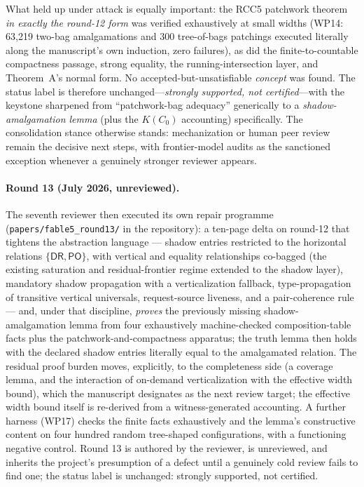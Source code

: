 \documentclass[
]{ceurart}
\theoremstyle{definition}
\newcommand{\DR}{\ensuremath{\mathsf{DR}}}
\newcommand{\PO}{\ensuremath{\mathsf{PO}}}
\begin{document}
What held up under attack is equally important: the RCC5 patchwork theorem
\emph{in exactly the round-12 form} was verified exhaustively at small
widths (WP14: 63{,}219 two-bag amalgamations and 300 tree-of-bags patchings
executed literally along the manuscript's own induction, zero failures), as
did the finite-to-countable compactness passage, strong equality, the
running-intersection layer, and Theorem~A's normal form.  No
accepted-but-unsatisfiable \emph{concept} was found.  The status label is
therefore unchanged---\emph{strongly supported, not certified}---with the
keystone sharpened from ``patchwork-bag adequacy'' generically to a
\emph{shadow-amalgamation lemma} (plus the $K(C_0)$ accounting)
specifically.  The consolidation stance otherwise stands: mechanization or
human peer review remain the decisive next steps, with frontier-model audits
as the sanctioned exception whenever a genuinely stronger reviewer appears.


\paragraph{Round 13 (July 2026, unreviewed).}
The seventh reviewer then executed its own repair programme
(\texttt{papers/fable5\_round13/} in the repository): a ten-page delta on
round-12 that tightens the abstraction language --- shadow entries
restricted to the horizontal relations $\{\DR,\PO\}$, with vertical and
equality relationships co-bagged (the existing saturation and
residual-frontier regime extended to the shadow layer), mandatory shadow
propagation with a verticalization fallback, type-propagation of
transitive vertical universals, request-source liveness, and a
pair-coherence rule --- and, under that discipline, \emph{proves} the
previously missing shadow-amalgamation lemma from four exhaustively
machine-checked composition-table facts plus the patchwork-and-compactness
apparatus; the truth lemma then holds with the declared shadow entries
literally equal to the amalgamated relation.  The residual proof burden
moves, explicitly, to the completeness side (a coverage lemma, and the
interaction of on-demand verticalization with the effective width bound),
which the manuscript designates as the next review target; the effective
width bound itself is re-derived from a witness-generated accounting.  A
further harness (WP17) checks the finite facts exhaustively and the
lemma's constructive content on four hundred random tree-shaped
configurations, with a functioning negative control.  Round 13 is
authored by the reviewer, is unreviewed, and inherits the project's
presumption of a defect until a genuinely cold review fails to find one;
the status label is unchanged: strongly supported, not certified.
\end{document}
